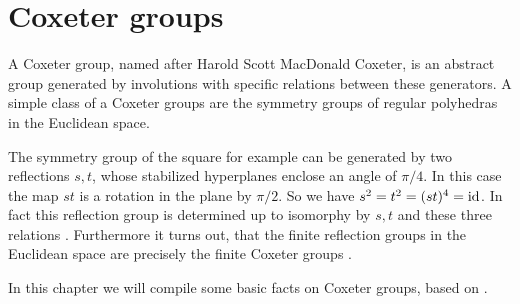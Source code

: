 \section{Coxeter groups}
\label{sec:coxeter-groups}

A Coxeter group, named after Harold Scott MacDonald Coxeter, is an abstract group generated by involutions with specific relations between these generators. A simple class of a Coxeter groups are the symmetry groups of regular polyhedras in the Euclidean space.

The symmetry group of the square for example can be generated by two reflections $s,t$, whose stabilized hyperplanes enclose an angle of $\pi / 4$. In this case the map $st$ is a rotation in the plane by $\pi / 2$. So we have $s^2 = t^2 = (st)^4 = \operatorname{id}$. In fact this reflection group is determined up to isomorphy by $s,t$ and these three relations \cite[Theorem 1.9]{humphreys:coxeter}. Furthermore it turns out, that the finite reflection groups in the Euclidean space are precisely the finite Coxeter groups \cite[Theorem 6.4]{humphreys:coxeter}.

In this chapter we will compile some basic facts on Coxeter groups, based on \cite{humphreys:coxeter}.





